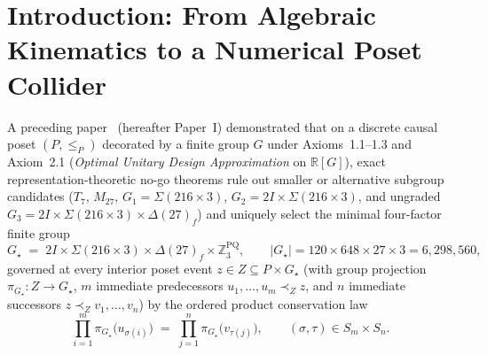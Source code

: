 \documentclass[11pt,a4paper]{article}
\theoremstyle{definition}
\theoremstyle{remark}
\newcommand{\R}{\mathbb{R}}
\newcommand{\Z}{\mathbb{Z}}
\newcommand{\Gthree}{G_3}
\newcommand{\Gstar}{G_\star}
\begin{document}
\newpage
\setcounter{tocdepth}{1}
\tableofcontents

\section{Introduction: From Algebraic Kinematics to a Numerical Poset Collider}

A preceding paper~\cite{PaperI} (hereafter Paper~I) demonstrated that on a discrete causal poset $(P, \le_P)$ decorated by a finite group $G$ under Axioms~1.1--1.3 and Axiom~2.1 (\emph{Optimal Unitary Design Approximation} on $\R[G]$), exact representation-theoretic no-go theorems rule out smaller or alternative subgroup candidates ($T_7$, $M_{27}$, $G_1 = \Sigma(216 \times 3)$, $G_2 = 2I \times \Sigma(216 \times 3)$, and ungraded $\Gthree = 2I \times \Sigma(216 \times 3) \times \Delta(27)_f$) and uniquely select the minimal four-factor finite group
\begin{equation}
\label{eq:gstar_def}
\Gstar \;=\; 2I \times \Sigma(216 \times 3) \times \Delta(27)_f \times \Z_3^{\mathrm{PQ}}, \qquad |\Gstar| = 120 \times 648 \times 27 \times 3 = 6{,}298{,}560,
\end{equation}
governed at every interior poset event $z \in Z \subseteq P \times \Gstar$ (with group projection $\pi_{\Gstar} : Z \to \Gstar$, $m$ immediate predecessors $u_1, \dots, u_m \prec_Z z$, and $n$ immediate successors $z \prec_Z v_1, \dots, v_n$) by the ordered product conservation law
\begin{equation}
\label{eq:axiom3}
\prod_{i=1}^m \pi_{\Gstar}\!\bigl(u_{\sigma(i)}\bigr) \;=\; \prod_{j=1}^n \pi_{\Gstar}\!\bigl(v_{\tau(j)}\bigr), \qquad (\sigma, \tau) \in S_m \times S_n.
\end{equation}
\end{document}
